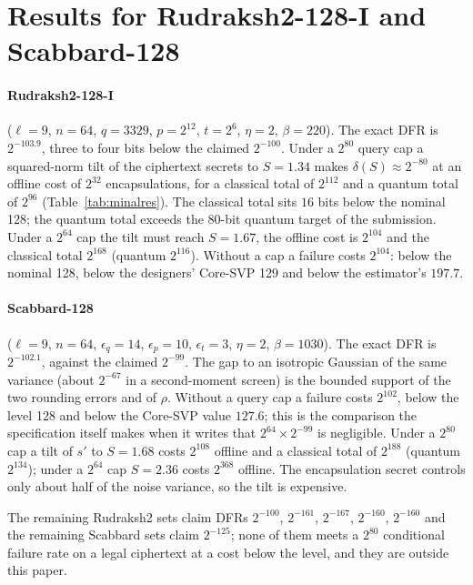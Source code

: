 \documentclass[11pt,a4paper]{article}
\theoremstyle{definition}
\theoremstyle{remark}
\newcommand{\dfr}{\delta}
\begin{document}
\section{Results for Rudraksh2-128-I and Scabbard-128}
\label{sec:minalresults}

\paragraph{Rudraksh2-128-I} ($\ell=9$, $n=64$, $q=3329$, $p=2^{12}$,
$t=2^{6}$, $\eta=2$, $\beta=220$). The exact DFR is $2^{-103.9}$, three
to four bits below the claimed $2^{-100}$. Under a $2^{80}$ query cap a
squared-norm tilt of the ciphertext secrets to $S=1.34$ makes
$\dfr(S)\approx2^{-80}$ at an offline cost of $2^{32}$ encapsulations,
for a classical total of $2^{112}$ and a quantum total of $2^{96}$
(Table~\ref{tab:minalres}). The classical total sits $16$ bits below the
nominal 128; the quantum total exceeds the 80-bit quantum target of the
submission. Under a $2^{64}$ cap the tilt must reach $S=1.67$, the
offline cost is $2^{104}$ and the classical total $2^{168}$ (quantum
$2^{116}$). Without a cap a failure costs $2^{104}$: below the nominal
128, below the designers' Core-SVP 129 and below the estimator's $197.7$.

\paragraph{Scabbard-128} ($\ell=9$, $n=64$, $\epsilon_q=14$,
$\epsilon_p=10$, $\epsilon_t=3$, $\eta=2$, $\beta=1030$). The exact DFR
is $2^{-102.1}$, against the claimed $2^{-99}$. The gap to an isotropic
Gaussian of the same variance (about $2^{-67}$ in a second-moment
screen) is the bounded support of the two rounding errors and of
$\rho$. Without a query cap a failure costs $2^{102}$, below the level
128 and below the Core-SVP value $127.6$; this is the comparison the
specification itself makes when it writes that $2^{64}\times 2^{-99}$ is
negligible. Under a $2^{80}$ cap a tilt of $s'$ to $S=1.68$ costs
$2^{108}$ offline and a classical total of $2^{188}$ (quantum $2^{134}$);
under a $2^{64}$ cap $S=2.36$ costs $2^{368}$ offline. The encapsulation
secret controls only about half of the noise variance, so the tilt is
expensive.

The remaining Rudraksh2 sets claim DFRs $2^{-100}$, $2^{-161}$,
$2^{-167}$, $2^{-160}$, $2^{-160}$ and the remaining Scabbard sets claim
$2^{-125}$; none of them meets a $2^{80}$ conditional failure rate on a
legal ciphertext at a cost below the level, and they are outside this
paper.
\end{document}
